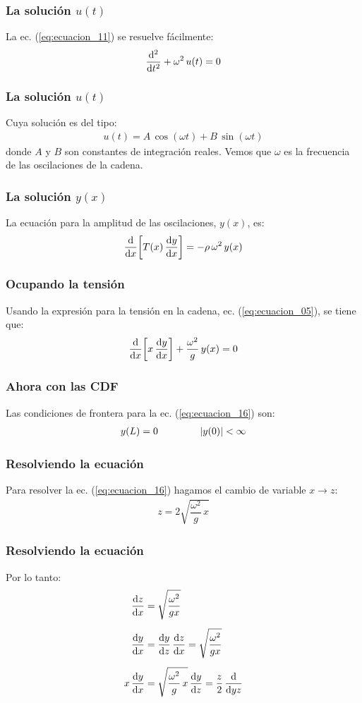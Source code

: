 \documentclass[12pt]{beamer}
\begin{document}
\begin{frame}
\frametitle{La solución $u (t)$}
La ec. (\ref{eq:ecuacion_11}) se resuelve fácilmente:
\pause
\begin{align}
\dv[2]{t} + \omega^{2} \, u (t) = 0
\label{eq:ecuacion_13}
\end{align}
\end{frame}
\begin{frame}
\frametitle{La solución $u (t)$}
Cuya solución es del tipo:
\pause
\begin{align}
u (t) = A \, \cos (\omega t) + B \, \sin (\omega t)
\label{eq:ecuacion_14}
\end{align}
\pause
donde $A$ y $B$ son constantes de integración reales. \pause Vemos que $\omega$ es la frecuencia de las oscilaciones de la cadena.
\end{frame}
\begin{frame}
\frametitle{La solución $y (x)$}
La ecuación para la amplitud de las oscilaciones, $y (x)$, es:
\pause
\begin{align}
\dv{x} \bigg[ T (x) \, \dv{y}{x} \bigg] = - \rho \, \omega^{2} \, y (x)
\label{eq:ecuacion_15}
\end{align}
\end{frame}
\begin{frame}
\frametitle{Ocupando la tensión}
Usando la expresión para la tensión en la cadena, ec. (\ref{eq:ecuacion_05}), se tiene que:
\pause
\begin{align}
\dv{x} \bigg[ x \, \dv{y}{x} \bigg] + \dfrac{\omega^{2}}{g} \, y(x) = 0
\label{eq:ecuacion_16}
\end{align}
\end{frame}
\begin{frame}
\frametitle{Ahora con las CDF}
Las condiciones de frontera para la ec. (\ref{eq:ecuacion_16}) son:
\pause
\begin{align}
y (L) = 0 \hspace{1.5cm} \abs{y (0)} < \infty
\label{eq:ecuacion_17}
\end{align}
\end{frame}
\begin{frame}
\frametitle{Resolviendo la ecuación}
Para resolver la ec. (\ref{eq:ecuacion_16}) hagamos el cambio de variable $x \to z$:
\pause
\begin{align}
z = 2 \sqrt{\dfrac{\omega^{2}}{g} \, x}
\label{eq:ecuacion_18}
\end{align}
\end{frame}
\begin{frame}
\frametitle{Resolviendo la ecuación}
Por lo tanto:
\pause
\begin{align}
\begin{aligned}[b]
\dv{z}{x} &= \sqrt{\dfrac{\omega^{2}}{g x}} \\[0.5em]
\dv{y}{x} &= \dv{y}{z} \, \dv{z}{x} = \sqrt{\dfrac{\omega^{2}}{g x}} \\[0.5em]
x \, \dv{y}{x} &= \sqrt{\dfrac{\omega^{2}}{g} \, x} \, \dv{y}{z} = \dfrac{z}{2} \, \dv{y{z}}
\end{aligned}
\label{eq:ecuacion_19}
\end{align}
\end{frame}
\end{document}
